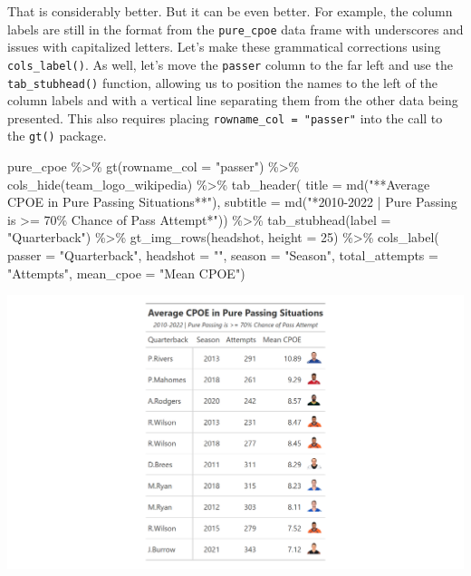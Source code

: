 \documentclass[
  letterpaper,
]{krantz}
\newenvironment{Shaded}{\begin{snugshade}}{\end{snugshade}}
\newcommand{\AttributeTok}[1]{\textcolor[rgb]{0.40,0.45,0.13}{#1}}
\newcommand{\DecValTok}[1]{\textcolor[rgb]{0.68,0.00,0.00}{#1}}
\newcommand{\FunctionTok}[1]{\textcolor[rgb]{0.28,0.35,0.67}{#1}}
\newcommand{\NormalTok}[1]{\textcolor[rgb]{0.00,0.23,0.31}{#1}}
\newcommand{\SpecialCharTok}[1]{\textcolor[rgb]{0.37,0.37,0.37}{#1}}
\newcommand{\StringTok}[1]{\textcolor[rgb]{0.13,0.47,0.30}{#1}}
\begin{document}
That is considerably better. But it can be even better. For example, the
column labels are still in the format from the \texttt{pure\_cpoe} data
frame with underscores and issues with capitalized letters. Let's make
these grammatical corrections using \texttt{cols\_label()}. As well,
let's move the \texttt{passer} column to the far left and use the
\texttt{tab\_stubhead()} function, allowing us to position the names to
the left of the column labels and with a vertical line separating them
from the other data being presented. This also requires placing
\texttt{rowname\_col\ =\ "passer"} into the call to the \texttt{gt()}
package.

\begin{Shaded}
\begin{Highlighting}[]
\NormalTok{pure\_cpoe }\SpecialCharTok{\%\textgreater{}\%}
  \FunctionTok{gt}\NormalTok{(}\AttributeTok{rowname\_col =} \StringTok{"passer"}\NormalTok{) }\SpecialCharTok{\%\textgreater{}\%}
  \FunctionTok{cols\_hide}\NormalTok{(team\_logo\_wikipedia) }\SpecialCharTok{\%\textgreater{}\%}
  \FunctionTok{tab\_header}\NormalTok{(}
    \AttributeTok{title =} \FunctionTok{md}\NormalTok{(}\StringTok{"**Average CPOE in Pure Passing Situations**"}\NormalTok{),}
    \AttributeTok{subtitle =} \FunctionTok{md}\NormalTok{(}\StringTok{"*2010{-}2022  |  Pure Passing is \textgreater{}= 70\%}
\StringTok{                  Chance of Pass Attempt*"}\NormalTok{)) }\SpecialCharTok{\%\textgreater{}\%}
  \FunctionTok{tab\_stubhead}\NormalTok{(}\AttributeTok{label =} \StringTok{"Quarterback"}\NormalTok{) }\SpecialCharTok{\%\textgreater{}\%}
  \FunctionTok{gt\_img\_rows}\NormalTok{(headshot, }\AttributeTok{height =} \DecValTok{25}\NormalTok{) }\SpecialCharTok{\%\textgreater{}\%}
  \FunctionTok{cols\_label}\NormalTok{(}
    \AttributeTok{passer =} \StringTok{"Quarterback"}\NormalTok{,}
    \AttributeTok{headshot =} \StringTok{""}\NormalTok{,}
    \AttributeTok{season =} \StringTok{"Season"}\NormalTok{,}
    \AttributeTok{total\_attempts =} \StringTok{"Attempts"}\NormalTok{,}
    \AttributeTok{mean\_cpoe =} \StringTok{"Mean CPOE"}\NormalTok{)}
\end{Highlighting}
\end{Shaded}

\includegraphics[width=6.61in,height=\textheight]{images/gt_table_2.png}
\end{document}
